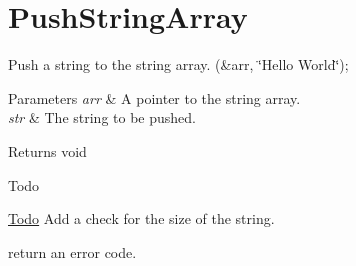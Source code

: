 \hypertarget{PushStringArray-example}{}\section{Push\+String\+Array}
Push a string to the string array. (\&arr, \char`\"{}\+Hello World\char`\"{}); 
\begin{DoxyParams}{Parameters}
{\em arr} & A pointer to the string array. \\
\hline
{\em str} & The string to be pushed. \\
\hline
\end{DoxyParams}
\begin{DoxyReturn}{Returns}
void
\end{DoxyReturn}
\begin{DoxyRefDesc}{Todo}
\item[\hyperlink{todo__todo000003}{Todo}]Add a check for the size of the string. 

return an error code. \end{DoxyRefDesc}



\begin{DoxyCodeInclude}
\end{DoxyCodeInclude}
 